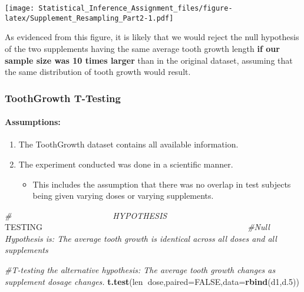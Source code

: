 \documentclass[]{article}
\newenvironment{Shaded}{\begin{snugshade}}{\end{snugshade}}
\newcommand{\KeywordTok}[1]{\textcolor[rgb]{0.13,0.29,0.53}{\textbf{#1}}}
\newcommand{\DataTypeTok}[1]{\textcolor[rgb]{0.13,0.29,0.53}{#1}}
\newcommand{\DecValTok}[1]{\textcolor[rgb]{0.00,0.00,0.81}{#1}}
\newcommand{\CommentTok}[1]{\textcolor[rgb]{0.56,0.35,0.01}{\textit{#1}}}
\newcommand{\OtherTok}[1]{\textcolor[rgb]{0.56,0.35,0.01}{#1}}
\newcommand{\OperatorTok}[1]{\textcolor[rgb]{0.81,0.36,0.00}{\textbf{#1}}}
\newcommand{\AlertTok}[1]{\textcolor[rgb]{0.94,0.16,0.16}{#1}}
\newcommand{\NormalTok}[1]{#1}
\providecommand{\tightlist}{%
  \setlength{\itemsep}{0pt}\setlength{\parskip}{0pt}}
\let\oldparagraph\paragraph
\renewcommand{\paragraph}[1]{\oldparagraph{#1}\mbox{}}
\begin{document}
\texttt{[image: Statistical\_Inference\_Assignment\_files/figure-latex/Supplement\_Resampling\_Part2-1.pdf]}

As evidenced from this figure, it is likely that we would reject the
null hypothesis of the two supplements having the same average tooth
growth length \textbf{if our sample size was 10 times larger} than in
the original dataset, assuming that the same distribution of tooth
growth would result.

\subsubsection{ToothGrowth T-Testing}\label{toothgrowth-t-testing}

\paragraph{Assumptions:}\label{assumptions}

\begin{enumerate}
\def\labelenumi{\arabic{enumi}.}
\tightlist
\item
  The ToothGrowth dataset contains all available information.
\item
  The experiment conducted was done in a scientific manner.

  \begin{itemize}
  \tightlist
  \item
    This includes the assumption that there was no overlap in test
    subjects being given varying doses or varying supplements.
  \end{itemize}
\end{enumerate}

\begin{Shaded}
\begin{Highlighting}[]
\CommentTok{#~~~~~~~~~~~~~~~~~~~~~~~~HYPOTHESIS }\AlertTok{TESTING}\CommentTok{~~~~~~~~~~~~~~~~~~~~~~~~~~~~~~~~~~~~~~~~~~~~~~~~}
\CommentTok{#Null Hypothesis is: The average tooth growth is identical across all doses and all supplements}

\CommentTok{#T-testing the alternative hypothesis: The average tooth growth changes as supplement dosage changes.}
\KeywordTok{t.test}\NormalTok{(len}\OperatorTok{~}\NormalTok{dose,}\DataTypeTok{paired=}\OtherTok{FALSE}\NormalTok{,}\DataTypeTok{data=}\KeywordTok{rbind}\NormalTok{(d1,d.}\DecValTok{5}\NormalTok{))}
\end{Highlighting}
\end{Shaded}
\end{document}
